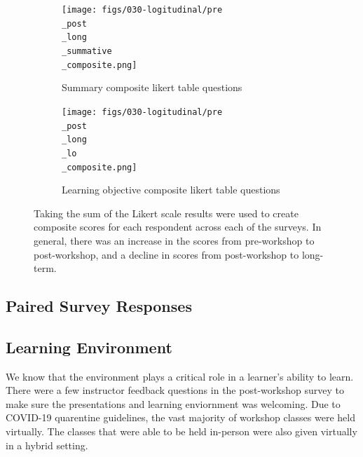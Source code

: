 \documentclass[030-workshop.tex]{subfiles}
\begin{document}
            \begin{figure}[htb]
                \centering
                \begin{subfigure}[h]{0.45\textwidth}
                    \centering
                    \texttt{[image: figs/030-logitudinal/pre\\\_post\\\_long\\\_summative\\\_composite.png]}
                    \caption[Pre-Post-workshop and Long-term Survey for summary likert composite]
                    {Summary composite likert table questions}
                    \label{sfig:pre-post-long-composite-summary}
                \end{subfigure}
                \hfill
                \begin{subfigure}[h]{0.45\textwidth}
                    \centering
                    \texttt{[image: figs/030-logitudinal/pre\\\_post\\\_long\\\_lo\\\_composite.png]}
                    \caption[Pre-Post-workshop and Long-term Survey for learning objective likert composite]
                    {Learning objective composite likert table questions}
                    \label{sfig:pre-post-long-composite-lo}
                \end{subfigure}
                \caption[Summary table and learning objective composite likert questions (pre, post, long-term)]
                {Taking the sum of the Likert scale results were used to create composite scores for each respondent
                 across each of the surveys.
                 In general, there was an increase in the scores from pre-workshop to post-workshop,
                 and a decline in scores from post-workshop to long-term.
                }
                \label{fig:pre-post-long-composite-summary-lo}
            \end{figure}

    \subsection{Paired Survey Responses}

    \subsection{Learning Environment}

        We know that the environment plays a critical role in a learner's ability to learn.
        There were a few instructor feedback questions in the post-workshop survey to make sure
        the presentations and learning enviornment was welcoming.
        Due to COVID-19 quarentine guidelines,
        the vast majority of workshop classes were held virtually.
        The classes that were able to be held in-person were also given virtually in a hybrid setting.
\end{document}
